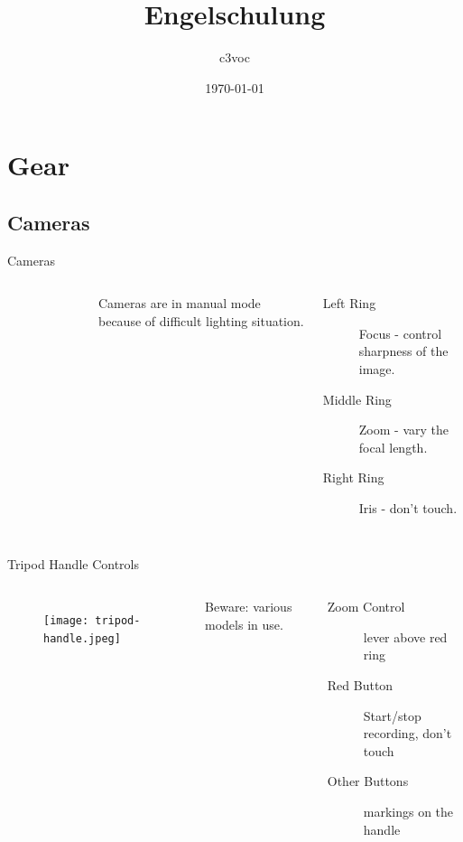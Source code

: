 \documentclass[hyperref={pdfpagelabels=false},aspectratio=169]{beamer}
\title{Engelschulung}    %
\author{c3voc}
\date{\today}
\begin{document}
\begin{frame}
\titlepage
\end{frame} 


\begin{frame}   %
\tableofcontents
\end{frame} 

\section{Gear}  %
\subsection{Cameras}
\begin{frame}{Cameras}
	\begin{columns}[T,onlytextwidth]
	\begin{figure} 
		\centering
		\def\svgwidth{1\textwidth}
		
	\end{figure}
	Cameras are in manual mode because of difficult lighting situation.
	\begin{description}
		\item[Left Ring] Focus - control sharpness of the image.
		\item[Middle Ring] Zoom - vary the focal length.
		\item[Right Ring] Iris - don't touch.
     \end{description}
\end{columns}
\end{frame}

\begin{frame}{Tripod Handle Controls} 		%
	\begin{columns}[T,onlytextwidth]
	\begin{figure} 
		\centering
		\texttt{[image: tripod-handle.jpeg]}
	\end{figure}
	Beware: various models in use.
	\begin{description}
		\item[Zoom Control] lever above red ring
		\item[Red Button] Start/stop recording, don't touch
		\item[Other Buttons] markings on the handle
    \end{description}
	\end{columns}
\end{frame}
\end{document}
